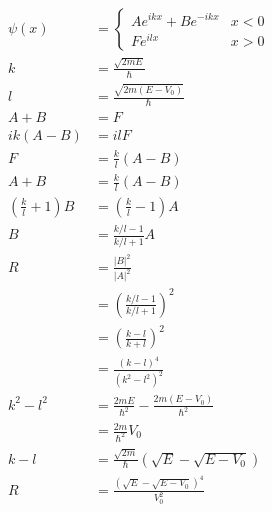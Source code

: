 \documentclass{article}
\begin{document}
\begin{enumerate}
        \begin{align*}
          \psi(x)                          & = \begin{cases}
                                                 A e^{i k x} + B e^{-i k x} & x < 0 \\
                                                 F e^{i l x}                & x > 0
                                               \end{cases}                    \\
          k                                & = \frac{\sqrt{2 m E}}{\hbar}                            \\
          l                                & = \frac{\sqrt{2 m (E - V_0)}}{\hbar}                    \\
          A + B                            & = F                                                     \\
          i k (A - B)                      & = i l F                                                 \\
          F                                & = \frac{k}{l} (A - B)                                   \\
          A + B                            & = \frac{k}{l} (A - B)                                   \\
          \left( \frac{k}{l} + 1 \right) B & = \left( \frac{k}{l} - 1 \right) A                      \\
          B                                & = \frac{k / l - 1}{k / l + 1} A                         \\
          R                                & = \frac{|B|^2}{|A|^2}                                   \\
                                           & = \left( \frac{k / l - 1}{k / l + 1} \right)^2          \\
                                           & = \left( \frac{k - l}{k + l} \right)^2                  \\
                                           & = \frac{(k - l)^4}{(k^2 - l^2)^2}                       \\
          k^2 - l^2                        & = \frac{2 m E}{\hbar^2} - \frac{2 m (E - V_0)}{\hbar^2} \\
                                           & = \frac{2 m}{\hbar^2} V_0                               \\
          k - l                            & = \frac{\sqrt{2 m}}{\hbar} (\sqrt{E} - \sqrt{E - V_0})  \\
          R                                & = \frac{(\sqrt{E} - \sqrt{E - V_0})^4}{V_0^2}
        \end{align*}


\end{enumerate}
\end{document}
